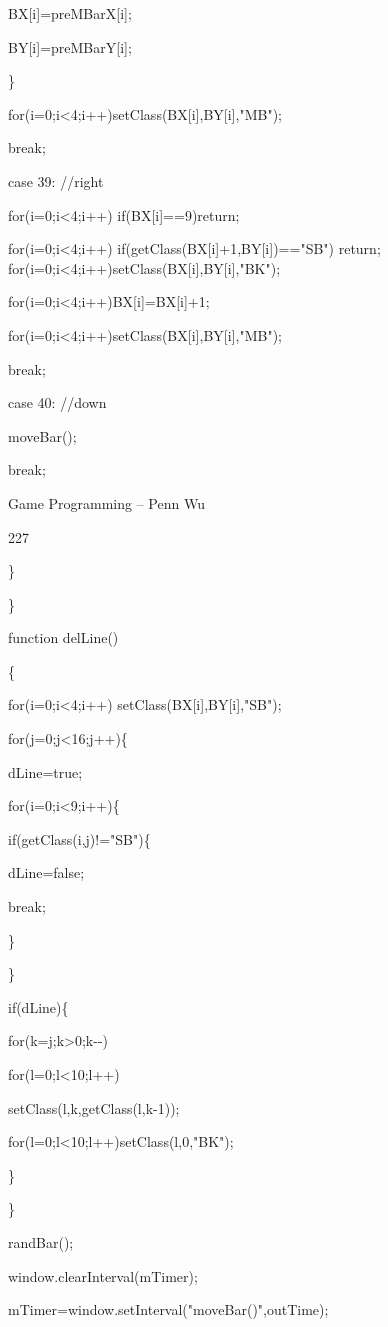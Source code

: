 \documentclass[
]{article}
\begin{document}
BX{[}i{]}=preMBarX{[}i{]};

BY{[}i{]}=preMBarY{[}i{]};

\}

for(i=0;i\textless4;i++)setClass(BX{[}i{]},BY{[}i{]},"MB");

break;

case 39: //right

for(i=0;i\textless4;i++) if(BX{[}i{]}==9)return;

for(i=0;i\textless4;i++) if(getClass(BX{[}i{]}+1,BY{[}i{]})=="SB")
return; for(i=0;i\textless4;i++)setClass(BX{[}i{]},BY{[}i{]},"BK");

for(i=0;i\textless4;i++)BX{[}i{]}=BX{[}i{]}+1;

for(i=0;i\textless4;i++)setClass(BX{[}i{]},BY{[}i{]},"MB");

break;

case 40: //down

moveBar();

break;

Game Programming -- Penn Wu

227

\protect\hypertarget{index_split_011.htmlux5cux23p228}{}{} \}

\}

function delLine()

\{

for(i=0;i\textless4;i++) setClass(BX{[}i{]},BY{[}i{]},"SB");

for(j=0;j\textless16;j++)\{

dLine=true;

for(i=0;i\textless9;i++)\{

if(getClass(i,j)!="SB")\{

dLine=false;

break;

\}

\}

if(dLine)\{

for(k=j;k\textgreater0;k-\/-)

for(l=0;l\textless10;l++)

setClass(l,k,getClass(l,k-1));

for(l=0;l\textless10;l++)setClass(l,0,"BK");

\}

\}

randBar();

window.clearInterval(mTimer);

mTimer=window.setInterval("moveBar()",outTime);
\end{document}
